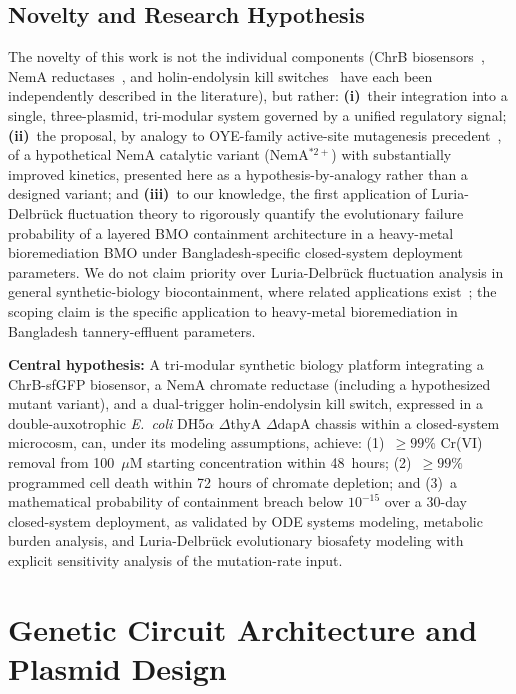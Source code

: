 \documentclass[10pt,twocolumn,letterpaper,
              colorlinks=true,
              linkcolor=blue!70!black,
              citecolor=blue!70!black,
              urlcolor=blue!70!black,
              pdfborder={0 0 0}]{article}
\begin{document}
\subsection{Novelty and Research Hypothesis}

The novelty of this work is not the individual components (ChrB
biosensors~\cite{branco2013}, NemA reductases~\cite{williams2003}, and
holin-endolysin kill switches~\cite{chan2016} have each been independently
described in the literature), but rather: \textbf{(i)}~their integration
into a single, three-plasmid, tri-modular system governed by a unified
regulatory signal; \textbf{(ii)}~the proposal, by analogy to OYE-family
active-site mutagenesis precedent~\cite{mowafy2010}, of a hypothetical
NemA catalytic variant (NemA$^{*2+}$) with substantially improved
kinetics, presented here as a hypothesis-by-analogy rather than a
designed variant; and \textbf{(iii)}~to our knowledge, the first
application of Luria-Delbr\"{u}ck fluctuation theory to rigorously
quantify the evolutionary failure probability of a layered BMO
containment architecture in a heavy-metal bioremediation BMO under
Bangladesh-specific closed-system deployment parameters. We do not claim
priority over Luria-Delbr\"{u}ck fluctuation analysis in general
synthetic-biology biocontainment, where related applications
exist~\cite{lee2012,stirling2017,rottinghaus2022}; the scoping claim is
the specific application to heavy-metal bioremediation in Bangladesh
tannery-effluent parameters.

\medskip
\textbf{Central hypothesis:} A tri-modular synthetic biology platform
integrating a ChrB-sfGFP biosensor, a NemA chromate reductase (including
a hypothesized mutant variant), and a dual-trigger holin-endolysin kill
switch, expressed in a double-auxotrophic \textit{E.~coli} DH5$\alpha$
$\Delta$thyA $\Delta$dapA chassis within a closed-system microcosm, can,
under its modeling assumptions, achieve: (1)~${\geq}99\%$ Cr(VI) removal
from 100~$\mu$M starting concentration within 48~hours; (2)~${\geq}99\%$
programmed cell death within 72~hours of chromate depletion; and
(3)~a mathematical probability of containment breach below $10^{-15}$
over a 30-day closed-system deployment, as validated by ODE systems
modeling, metabolic burden analysis, and Luria-Delbr\"{u}ck evolutionary
biosafety modeling with explicit sensitivity analysis of the
mutation-rate input.

\section{Genetic Circuit Architecture and Plasmid Design}
\end{document}
